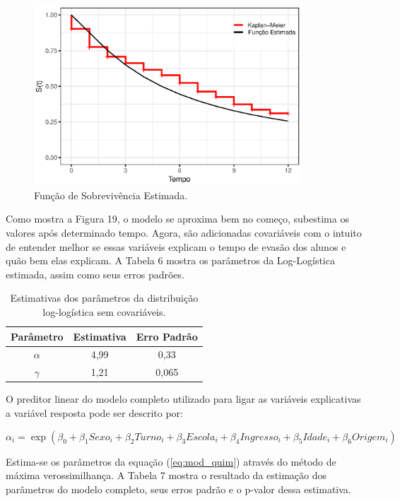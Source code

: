 \documentclass[a4paper,12pt]{article}
\begin{document}
\begin{figure}[H]
\centering
\includegraphics[width=10cm]{mod_log_quim}
\caption{Função de Sobrevivência Estimada.}
\end{figure}

Como mostra a Figura 19, o modelo se aproxima bem no começo, subestima os valores após determinado tempo. Agora, são adicionadas covariáveis com o intuito de entender melhor se essas variáveis explicam o tempo de evasão dos alunos e quão bem elas explicam.  A Tabela 6 mostra os parâmetros da Log-Logística estimada, assim como seus erros padrões.

\begin{table}[H]
\centering
\caption{Estimativas dos parâmetros da distribuição log-logística sem covariáveis.}
\begin{tabular}{c|cc}
\hline
Parâmetro & Estimativa & Erro Padrão \\
\hline
$\alpha$ & 4,99 & 0,33  \\

$\gamma$ & 1,21 & 0,065 \\
\hline
\end{tabular}
\end{table}


O preditor linear do modelo completo utilizado para ligar as variáveis explicativas a variável resposta pode ser descrito por:

\begin{equation} \label{eq:mod_quim}
  \alpha_i = \exp(\beta_0 + \beta_1 Sexo_i + \beta_2Turno_i + \beta_3Escola_i + \beta_4Ingresso_i + \beta_5 Idade_i + \beta_6 Origem_i)
\end{equation}


Estima-se os parâmetros da equação (\ref{eq:mod_quim}) através do método de máxima verossimilhança. A Tabela 7 mostra o resultado da estimação dos parâmetros do modelo completo, seus erros padrão e o p-valor dessa estimativa.
\end{document}
